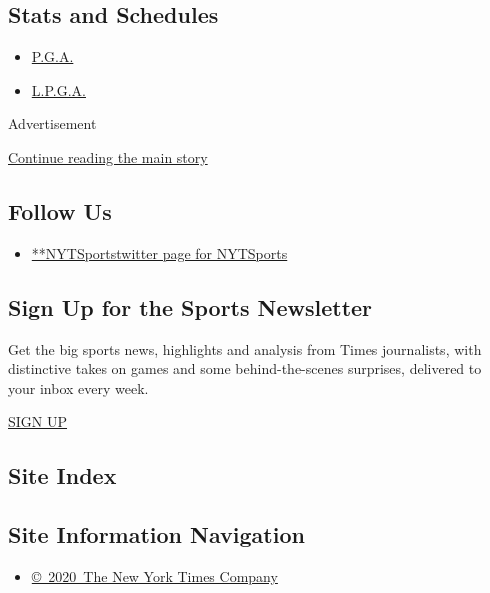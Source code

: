 \hypertarget{stats-and-schedules}{%
\subsection{Stats and Schedules}\label{stats-and-schedules}}

\begin{itemize}
\tightlist
\item
  \protect\hyperlink{}{P.G.A.}
\item
  \protect\hyperlink{}{L.P.G.A.}
\end{itemize}

Advertisement

\protect\hyperlink{after-mktg}{Continue reading the main story}

\hypertarget{follow-us}{%
\subsection{Follow Us}\label{follow-us}}

\begin{itemize}
\tightlist
\item
  \href{https://twitter.com/NYTSports}{**NYTSportstwitter page for
  NYTSports}
\end{itemize}

\hypertarget{sign-up-for-the-sports-newsletter}{%
\subsection{Sign Up for the Sports
Newsletter}\label{sign-up-for-the-sports-newsletter}}

Get the big sports news, highlights and analysis from Times journalists,
with distinctive takes on games and some behind-the-scenes surprises,
delivered to your inbox every week.

\href{/newsletters/signup/SP}{SIGN UP}

\hypertarget{site-index}{%
\subsection{Site Index}\label{site-index}}

\hypertarget{site-information-navigation}{%
\subsection{Site Information
Navigation}\label{site-information-navigation}}

\begin{itemize}
\tightlist
\item
  \href{https://help.nytimes3xbfgragh.onion/hc/en-us/articles/115014792127-Copyright-notice}{©~2020~The
  New York Times Company}
\end{itemize}

